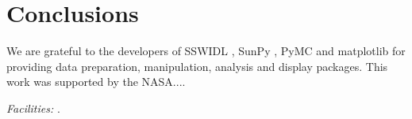 \documentclass[preprint]{../aastex52/aastex}
\begin{document}
\section{Conclusions}\label{sec:conc}




\acknowledgments

We are grateful to the developers of SSWIDL \cite{}, SunPy \cite{},
PyMC \cite{} and matplotlib \cite{} for providing data preparation,
manipulation, analysis and display packages.  This work was supported
by the NASA....



{\it Facilities:} .

\end{document}
